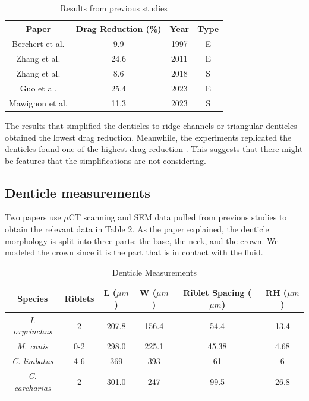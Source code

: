 \documentclass[graybox]{svmult}
\begin{document}
\begin{table}[h]
    \centering
    \begin{tabular}{|c|c|c|c|} 
        \hline
        Paper & Drag Reduction (\%) & Year & Type\\ 
        \hline
        Berchert et al. \cite{bechert_experiments_1997} & 9.9 & 1997 & E \\
        Zhang et al. \cite{zhang_high-precision_2011} & 24.6 & 2011 & E \\
        Zhang et al.\cite{zhang_numerical_2018} & 8.6 & 2018 & S\\
        Guo et al. \cite{guo_experimental_2023} & 25.4 & 2023 & E \\
        Mawignon et al. \cite{mawignon_optimization_2023} & 11.3 & 2023 & S\\
        \hline
    \end{tabular}
    \caption{Results from previous studies}
    \label{table:1}
\end{table}

The results that simplified the denticles to ridge channels \cite{bechert_experiments_1997} or triangular denticles obtained the lowest drag reduction. Meanwhile, the experiments replicated the denticles found one of the highest drag reduction \cite{zhang_high-precision_2011}. This suggests that there might be features that the simplifications are not considering.

\subsection{Denticle measurements}

Two papers \cite{ankhelyi_diversity_2018, motta_scale_2012} use $\mu$CT scanning and SEM data pulled from previous studies to obtain the relevant data in Table \ref{table:2}. As the paper \cite{motta_scale_2012} explained, the denticle morphology is split into three parts: the base, the neck, and the crown. We modeled the crown since it is the part that is in contact with the fluid.

\newpage
\begin{table}[h]
    \centering
    \begin{tabular}{|c|c|c|c|c|c|} 
        \hline
        Species & Riblets &  L ($\mu m$) & W ($\mu m$) & Riblet Spacing ($\mu m$) & RH ($\mu m$) \\ 
        \hline
        \textit{I. oxyrinchus} & 2 & 207.8 & 156.4 & 54.4 & 13.4 \\ 
        \textit{M. canis} & 0-2 & 298.0 &  225.1 &   45.38 & 4.68 \\
        \textit{C. limbatus} & 4-6 & 369 & 393 & 61 & 6 \\
        \textit{C. carcharias} & 2 &  301.0 & 247 & 99.5 & 26.8 \\
        \hline
    \end{tabular}
    \caption{Denticle Measurements}
    \label{table:2}
\end{table}
\end{document}
